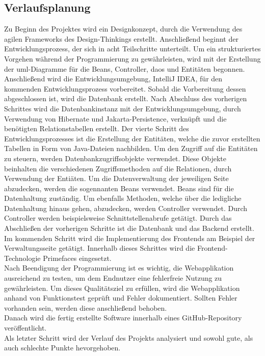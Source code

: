 \documentclass[11pt]{article}
\begin{document}
    \subsection{Verlaufsplanung}
    Zu Beginn des Projektes wird ein Designkonzept, durch die Verwendung des agilen Frameworks des Design-Thinkings erstellt.
    Anschließend beginnt der Entwicklungsprozess, der sich in acht Teilschritte unterteilt. Um ein strukturiertes Vorgehen während der
    Programmierung zu gewährleisten, wird mit der Erstellung der \gls{uml}-Diagramme für die Beans, Controller, \gls{daos} und Entitäten begonnen. Anschließend wird die
    Entwicklungsumgebung, IntelliJ IDEA, für den kommenden Entwicklungsprozess vorbereitet. Sobald die Vorbereitung dessen abgeschlossen ist, wird die Datenbank
    erstellt. Nach Abschluss des vorherigen Schrittes wird die Datenbankinstanz mit der Entwicklungsumgebung, durch Verwendung von Hibernate und Jakarta-Persistence, verknüpft und die benötigten Relationstabellen erstellt. Der vierte Schritt des Entwicklungsprozesses ist die Erstellung der
    Entitäten, welche die zuvor erstellten Tabellen in Form von Java-Dateien nachbilden. Um den Zugriff auf die Entitäten zu steuern, werden Datenbankzugriffsobjekte verwendet.
    Diese Objekte beinhalten die verschiedenen Zugriffsmethoden auf die Relationen, durch Verwendung der Entiäten. Um die Datenverwaltung der jeweiligen Seite abzudecken, werden die sogennanten Beans verwendet. Beans sind für
    die Datenhaltung zuständig. Um ebenfalls Methoden, welche über die ledigliche Datenhaltung hinaus gehen, abzudecken, werden Controller verwendet. Durch Controller werden beispielsweise Schnittstellenabrufe getätigt. 
    Durch das Abschließen der vorherigen Schritte ist die Datenbank und das Backend erstellt. Im kommenden Schritt wird die Implementierung des Frontends am Beispiel der Verwaltungsseite getätigt. Innerhalb dieses Schrittes
    wird die Frontend-Technologie Primefaces eingesetzt.
    \\
    Nach Beendigung der Programmierung ist es wichtig, die Webapplikation ausreichend zu testen, um dem Endnutzer eine fehlerfreie Nutzung zu gewährleisten.
    Um dieses Qualitätsziel zu erfüllen, wird die Webapplikation anhand von Funktionstest geprüft und Fehler dokumentiert. Sollten Fehler vorhanden sein, werden diese
    anschließend behoben.
    \\
    Danach wird die fertig erstellte Software innerhalb eines GitHub-Repository veröffentlicht.
    \\
    Als letzter Schritt wird der Verlauf des Projekts analysiert und sowohl gute, als auch schlechte Punkte hevorgehoben.
\end{document}
